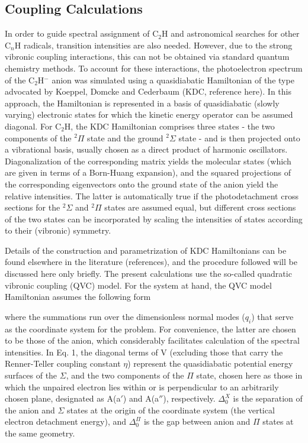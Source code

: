 \documentclass[journal=jpcafh,manuscript=article,layout=onecolumn, 12pt]{achemso}
\begin{document}
\subsection{Coupling Calculations}
In order to guide spectral assignment of C$_2$H and astronomical searches for other C$_n$H radicals, transition intensities are also needed. However, due to the strong vibronic coupling interactions, this can not be obtained via standard quantum chemistry methods. To account for these interactions, the photoelectron spectrum of the C$_2$H$^-$ anion was simulated using a quasidiabatic Hamiltonian of the type advocated by Koeppel, Domcke and Cederbaum (KDC, reference here).   In this approach, the Hamiltonian is represented in a basis of quasidiabatic (slowly varying) electronic  states for which the kinetic energy operator can be assumed diagonal.   For C$_2$H, the KDC Hamiltonian comprises three states - the two components of the $^2\Pi$ state and the ground $^2\Sigma$ state - and is then projected onto a vibrational basis, usually chosen as a direct product of harmonic oscillators.  Diagonalization of the corresponding matrix yields the molecular states (which are given in terms of a Born-Huang expansion), and the squared projections of the corresponding eigenvectors onto the ground state of the anion yield the relative intensities. The latter is automatically true if the photodetachment cross sections for the $^2\Sigma$ and $^2\Pi$ states are assumed equal, but different cross sections of the two states can be incorporated by scaling the intensities of states according to their (vibronic) symmetry. 

Details of the construction and parametrization of KDC Hamiltonians can be found elsewhere in the literature (references), and the procedure followed will be discussed here only briefly.   The present calculations use the so-called quadratic vibronic coupling (QVC) model.  For the system at hand, the QVC model Hamiltonian  assumes the following form

where the summations run over the dimensionless normal modes ($q_i$) that serve as the coordinate system for the problem.   For convenience, the latter are chosen to be those of the anion, which considerably facilitates calculation of the spectral intensities.  In Eq. 1, the diagonal terms of V (excluding those that carry the Renner-Teller coupling constant $\eta$) represent the quasidiabatic potential energy surfaces of the $\Sigma$, and the two components of the $\Pi$ state, chosen here as those in which the unpaired electron lies within or is perpendicular to an arbitrarily chosen plane, designated as A(a$'$) and A(a$''$), respectively. $\Delta_0^X$ is the separation of the anion and $\Sigma$ states at the origin of the coordinate system (the vertical electron detachment energy), and $\Delta_0^{\Pi}$ is the gap between anion and $\Pi$ states at the same geometry.   
\end{document}
